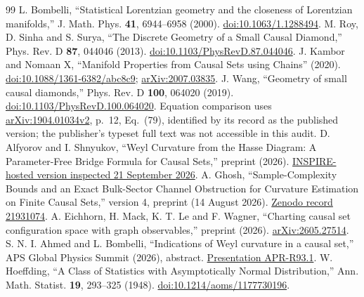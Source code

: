 \documentclass[11pt,a4paper]{article}
\begin{document}
\begin{thebibliography}{99}
 L. Bombelli, ``Statistical Lorentzian geometry and the
closeness of Lorentzian manifolds,'' J. Math. Phys. \textbf{41}, 6944--6958 (2000).
\href{https://doi.org/10.1063/1.1288494}{doi:10.1063/1.1288494}.
 M. Roy, D. Sinha and S. Surya, ``The Discrete Geometry of a Small
Causal Diamond,'' Phys. Rev. D \textbf{87}, 044046 (2013).
\href{https://doi.org/10.1103/PhysRevD.87.044046}{doi:10.1103/PhysRevD.87.044046}.
 J. Kambor and Nomaan X, ``Manifold Properties from Causal Sets
using Chains'' (2020).
\href{https://doi.org/10.1088/1361-6382/abc8c9}{doi:10.1088/1361-6382/abc8c9};
\href{https://arxiv.org/abs/2007.03835}{arXiv:2007.03835}.
 J. Wang, ``Geometry of small causal diamonds,'' Phys. Rev. D
\textbf{100}, 064020 (2019).
\href{https://doi.org/10.1103/PhysRevD.100.064020}{doi:10.1103/PhysRevD.100.064020}.
Equation comparison uses
\href{https://arxiv.org/pdf/1904.01034v2}{arXiv:1904.01034v2}, p.~12,
Eq.~(79), identified by its record as the published version; the publisher's
typeset full text was not accessible in this audit.
 D. Alfyorov and I. Shnyukov, ``Weyl Curvature from the Hasse
Diagram: A Parameter-Free Bridge Formula for Causal Sets,'' preprint (2026).
\href{https://inspirehep.net/files/32388edfda552e0b4cfb6697bda66d7b}{INSPIRE-hosted version inspected 21 September 2026}.
 A. Ghosh, ``Sample-Complexity Bounds and an Exact Bulk-Sector
Channel Obstruction for Curvature Estimation on Finite Causal Sets,'' version 4,
preprint (14 August 2026).
\href{https://zenodo.org/records/21931074}{Zenodo record 21931074}.
 A. Eichhorn, H. Mack, K. T. Le and F. Wagner,
``Charting causal set configuration space with graph observables,'' preprint
(2026). \href{https://arxiv.org/abs/2605.27514}{arXiv:2605.27514}.
 S. N. I. Ahmed and L. Bombelli, ``Indications of Weyl curvature in a causal
set,'' APS Global Physics Summit (2026), abstract.
\href{https://meetings-archive.aps.org/smt/2026/apr-r93/1/}{Presentation APR-R93.1}.
 W. Hoeffding, ``A Class of Statistics with Asymptotically
Normal Distribution,'' Ann. Math. Statist. \textbf{19}, 293--325 (1948).
\href{https://doi.org/10.1214/aoms/1177730196}{doi:10.1214/aoms/1177730196}.
\end{thebibliography}
\end{document}
